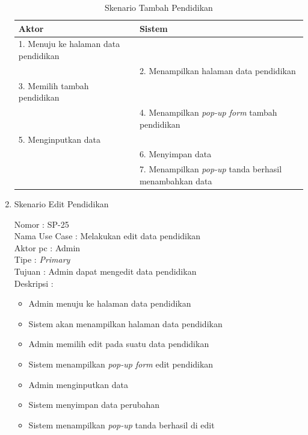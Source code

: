 \begin{enumerate}
\begin{itemize}
\end{itemize}

\begin{table}
	\caption{Skenario Tambah Pendidikan}
	\centering
	\begin{tabular}{ | l | p{62mm} |}
		\hline 
		\textbf{Aktor} & \textbf{Sistem} \\
		\hline
		
		1.	Menuju ke halaman data pendidikan &  \\
		
		\hline
		
		&  2.	Menampilkan halaman data pendidikan \\
		
		\hline
		
		3. Memilih tambah pendidikan & \\
		
		\hline
		
		& 4.	Menampilkan \textit{pop-up form} tambah pendidikan \\
		
		\hline
		
		5.	Menginputkan data  & \\
		\hline
		
		& 6.	Menyimpan data \\
		\hline
		
		& 7.	Menampilkan \textit{pop-up} tanda berhasil menambahkan data \\
		\hline
		
	\end{tabular}
\end{table}

\item Skenario Edit Pendidikan

Nomor \kern 3.6pc : SP-25 \\
Nama Use Case : Melakukan edit data pendidikan \\
Aktor  pc : Admin \\
Tipe \kern 4.6pc : \textit{Primary} \\
Tujuan \kern 3.6pc : Admin dapat mengedit data pendidikan \\
Deskripsi \kern 2.5pc : 

\begin{itemize}
	\item Admin menuju ke halaman data pendidikan
	\item Sistem akan menampilkan halaman data pendidikan
	\item Admin memilih edit pada suatu data pendidikan
	\item Sistem menampilkan \textit{pop-up form} edit pendidikan
	\item Admin menginputkan data
	\item Sistem menyimpan data perubahan
	\item Sistem menampilkan\textit{ pop-up} tanda berhasil di edit
	

\end{itemize}
\end{enumerate}
